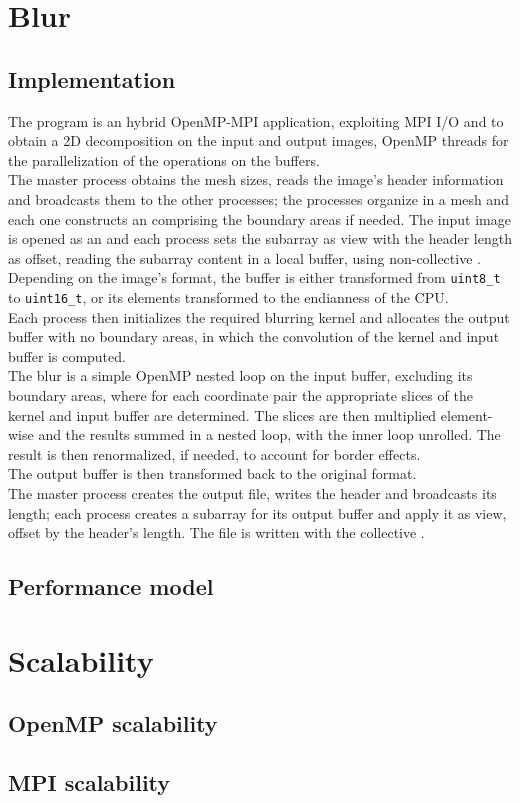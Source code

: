 \documentclass[a4paper, 11pt, twoside, openright]{article}
\begin{document}
\section{Blur}

\subsection{Implementation}
The program is an hybrid OpenMP-MPI application, exploiting MPI I/O and  to obtain a 2D decomposition on the input and output images, OpenMP threads for the parallelization of the operations on the buffers.\\
The master process obtains the mesh sizes, reads the image's header information and broadcasts them to the other processes; the processes organize in a mesh and each one constructs an  comprising the boundary areas if needed. The input image is opened as an  and each process sets the subarray as view with the header length as offset, reading the subarray content in a local buffer, using non-collective .\\
Depending on the image's format, the buffer is either transformed from \texttt{uint8\_t} to \texttt{uint16\_t}, or its elements transformed to the endianness of the CPU.\\
Each process then initializes the required blurring kernel and allocates the output buffer with no boundary areas, in which the convolution of the kernel and input buffer is computed.\\
The blur is a simple OpenMP nested loop on the input buffer, excluding its boundary areas, where for each coordinate pair the appropriate slices of the kernel and input buffer are determined. The slices are then multiplied element-wise and the results summed in a nested loop, with the inner loop unrolled. The result is then renormalized, if needed, to account for border effects.\\ 
The output buffer is then transformed back to the original format.\\
The master process creates the output file, writes the header and broadcasts its length; each process creates a subarray for its output buffer and apply it as view, offset by the header's length. The file is written with the collective .\\

\subsection{Performance model}

\section{Scalability}

\subsection{OpenMP scalability}

\subsection{MPI scalability}
\end{document}
